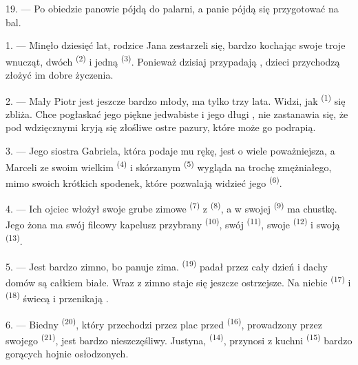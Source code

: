 19. --- Po obiedzie panowie pójdą do palarni, a panie pójdą się przygotować na bal.

\VUsaut{5.0mm}
\VUsaut{1.6mm}
\VUsaut{2.6mm}

\VUsaut{3.0mm}

1. --- Minęło dziesięć lat, rodzice Jana zestarzeli się, bardzo kochając swoje troje
wnucząt, dwóch  \textsuperscript{(2)} i jedną 
\textsuperscript{(3)}. Ponieważ dzisiaj przypadają , dzieci
przychodzą złożyć im dobre życzenia.

2. --- Mały Piotr jest jeszcze bardzo młody, ma tylko trzy lata. Widzi, jak
 \textsuperscript{(1)} się zbliża. Chce pogłaskać jego piękne jedwabiste
 i jego długi , nie zastanawia się, że pod wdzięcznymi
 kryją się złośliwe ostre pazury, które może go podrapią.

3. --- Jego siostra Gabriela, która podaje mu rękę, jest o wiele poważniejsza, a Marceli
ze swoim wielkim  \textsuperscript{(4)} i skórzanym 
\textsuperscript{(5)} wygląda na trochę zmężniałego, mimo swoich krótkich spodenek,
które pozwalają widzieć jego  \textsuperscript{(6)}.

4. --- Ich ojciec włożył swoje grube zimowe  \textsuperscript{(7)} z
 \textsuperscript{(8)}, a w swojej 
\textsuperscript{(9)} ma chustkę. Jego żona ma swój filcowy kapelusz przybrany
 \textsuperscript{(10)}, swój  \textsuperscript{(11)},
swoje  \textsuperscript{(12)} i swoją  \textsuperscript{(13)}.

5. --- Jest bardzo zimno, bo panuje zima.  \textsuperscript{(19)} padał
przez cały dzień i dachy domów są całkiem białe. Wraz z  zimno staje się
jeszcze ostrzejsze. Na niebie  \textsuperscript{(17)} i 
\textsuperscript{(18)} świecą i przenikają .

\VUsaut{4.2mm}
\VUsaut{3.0mm}

6. --- Biedny  \textsuperscript{(20)}, który przechodzi przez plac przed
 \textsuperscript{(16)}, prowadzony przez swojego 
\textsuperscript{(21)}, jest bardzo nieszczęśliwy. Justyna, 
\textsuperscript{(14)}, przynosi z kuchni  \textsuperscript{(15)} bardzo
gorących  hojnie osłodzonych.

